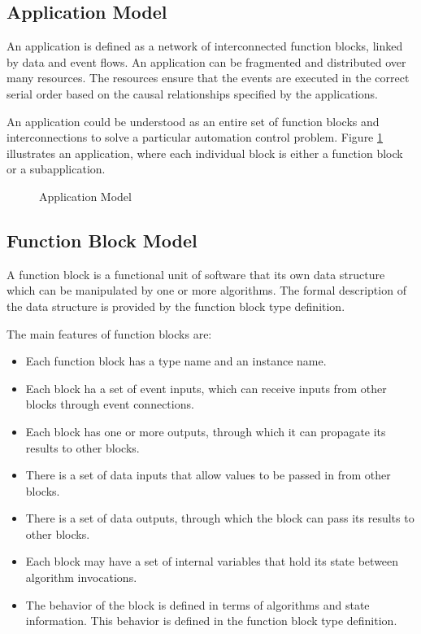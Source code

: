 \subsection{Application Model} 
An application is defined as a network of interconnected
function blocks, linked by data and event flows. An
application can be fragmented and distributed over many
resources. The resources ensure that the events are executed
in the correct serial order based on the causal
relationships specified by the applications.
  
An application could be understood as an entire set of
function blocks and interconnections to solve a particular
automation control problem. Figure \ref{f:Application_Model}
illustrates an application, where each individual block is
either a function block or a subapplication.

\begin{figure}
  \begin{center}
    \caption[Application Model]
            {Application Model{\protect ~\cite{iec:614991:2000}}} 
    \label{f:Application_Model}
  \end{center}
\end{figure}
  
\subsection{Function Block Model} 
A function block is a functional unit of software that its
own data structure which can be manipulated by one or more
algorithms. The formal description of the data structure is
provided by the function block type definition.
  
The main features of function blocks are:
\begin{itemize}
\item Each function block has a type name and an instance
  name.
\item Each block ha a set of event inputs, which can
  receive inputs from other blocks through event
  connections.
\item Each block has one or more outputs, through which it
  can propagate its results to other blocks.
\item There is a set of data inputs that allow values to
  be passed in from other blocks.
\item There is a set of data outputs, through which the
  block can pass its results to other blocks.
\item Each block may have a set of internal variables that
  hold its state between algorithm invocations.
\item The behavior of the block is defined in terms of
  algorithms and state information. This behavior is
  defined in the function block type definition.
\end{itemize}

